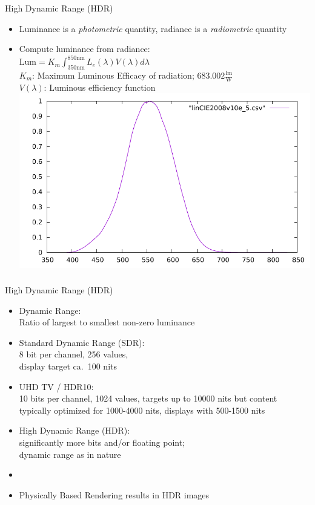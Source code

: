 \documentclass[utf8,stillsansserifmath,fleqn,t]{beamer}
\newcommand{\ds}{\displaystyle}
\begin{document}
\begin{frame}
\frametitle{\insertsection}
High Dynamic Range (HDR)
\begin{itemize}
\item Luminance is a \emph{photometric} quantity, radiance is a \emph{radiometric} quantity
\item Compute luminance from radiance:\\
    $\ds \text{Lum} = K_m \int_{350\text{nm}}^{850\text{nm}} L_e(\lambda)V(\lambda) d\lambda$\\
    $K_m$: Maximum  Luminous Efficacy of radiation; $683.002 \frac{\text{lm}}{\text{W}}$\\
    $V(\lambda)$: Luminous efficiency function\\
    \includegraphics[width=.55\textwidth]{./fig/luminous-efficiency.pdf}
\end{itemize}
\end{frame}

\begin{frame}[label=hdr-1]
\frametitle{\insertsection}
High Dynamic Range (HDR)
\begin{itemize}
\item Dynamic Range:\\ Ratio of largest to smallest non-zero luminance
\item Standard Dynamic Range (SDR):\\ 8 bit per channel, 256 values,\\
    display target ca.~100 nits
\item UHD TV / HDR10:\\ 10 bits per channel, 1024 values, targets up to 10000 nits
    but content typically optimized for 1000-4000 nits, displays with 500-1500 nits
\item High Dynamic Range (HDR):\\ significantly more bits and/or floating point;\\
    dynamic range as in nature
\item[~]
\item Physically Based Rendering results in HDR images
\end{itemize}
\end{frame}
\end{document}
